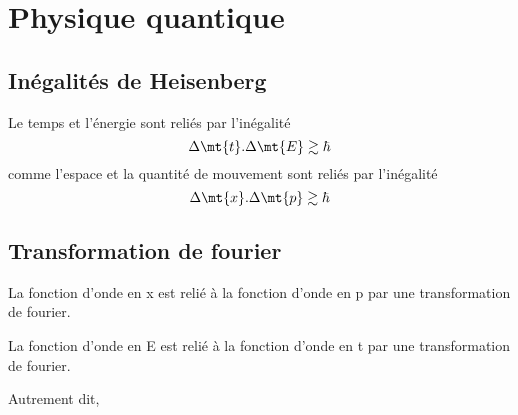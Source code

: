 
\chapter{Physique quantique}
%
\section{Inégalités de Heisenberg}



Le temps et l'énergie sont reliés par l'inégalité
\[
\Delta\mt{t}.\Delta\mt{E}\gtrsim\hbar
\]
comme l'espace et la quantité de mouvement sont reliés par l'inégalité
\[
\Delta\mt{x}.\Delta\mt{p}\gtrsim\hbar
\]

\section{Transformation de fourier}

La fonction d'onde en x est relié à la fonction d'onde en p par une transformation de fourier.


La fonction d'onde en E est relié à la fonction d'onde en t par une transformation de fourier.

Autrement dit, 
